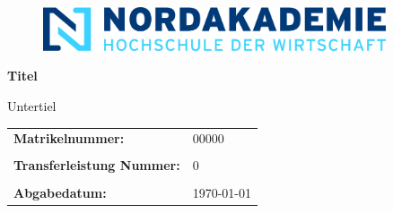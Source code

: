 \thispagestyle{empty}

\vspace{1.5cm}

\begin{figure}[h]
    \centering
    \includegraphics[width=0.9\textwidth]{template/logoNA.png}
\end{figure}

\vspace{1.5cm}

\begin{center}
    \textbf{\Huge{Titel}}

\end{center}

\vspace{1.5cm}

\begin{center}
    Untertiel\\
\end{center}

\vspace{4.0cm}

\begin{flushleft}
    \begin{tabular}{ll}
        \textbf{Matrikelnummer:}  & 00000 \\
        &\\
        \textbf{Transferleistung Nummer:} & 0 \\
        &\\
        \textbf{Abgabedatum:}  & \today \\
    \end{tabular}
\end{flushleft}

\pagebreak